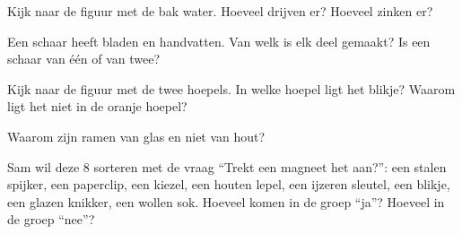 \begin{exercise}[$\star$]\label{exo:g1:materials-around-us:7}
Kijk naar de figuur met de bak water. Hoeveel  drijven er?
Hoeveel zinken er?
\end{exercise}

\begin{exercise}[$\star$]\label{exo:g1:materials-around-us:8}
Een schaar heeft bladen en handvatten. Van welk  is elk deel
gemaakt? Is een schaar van één  of van twee?
\end{exercise}

\begin{exercise}[$\star$]\label{exo:g1:materials-around-us:9}
Kijk naar de figuur met de twee hoepels. In welke hoepel ligt het
blikje? Waarom ligt het niet in de oranje hoepel?
\end{exercise}

\begin{exercise}[$\star\star$]\label{exo:g1:materials-around-us:10}
Waarom zijn ramen van glas en niet van hout?
\end{exercise}

\begin{exercise}[$\star\star$]\label{exo:g1:materials-around-us:11}
Sam wil deze 8  sorteren met de vraag ``Trekt een magneet het
aan?'': een stalen spijker, een paperclip, een kiezel, een houten lepel,
een ijzeren sleutel, een blikje, een glazen knikker, een wollen sok.
Hoeveel  komen in de groep ``ja''? Hoeveel in de groep
``nee''?
\end{exercise}
